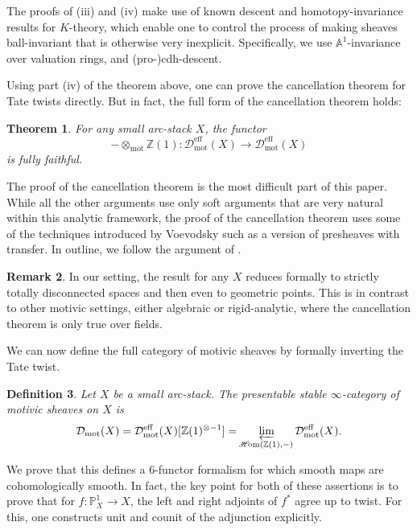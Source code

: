 \documentclass[11pt]{amsart}
\DeclareMathOperator{\intHom}{\!{\mathscr{H}\! om}}
\numberwithin{equation}{section}
\newtheorem{theorem}{Theorem}
\numberwithin{theorem}{section}
\newtheorem{definition}[theorem]{Definition}
\theoremstyle{definition}
\newtheorem{remark}[theorem]{Remark}
\begin{document}
The proofs of (iii) and (iv) make use of known descent and homotopy-invariance results for $K$-theory, which enable one to control the process of making sheaves ball-invariant that is otherwise very inexplicit. Specifically, we use $\mathbb A^1$-invariance over valuation rings, and (pro-)cdh-descent.

Using part (iv) of the theorem above, one can prove the cancellation theorem for Tate twists directly. But in fact, the full form of the cancellation theorem holds:

\begin{theorem} For any small arc-stack $X$, the functor
\[
-\otimes_{\mathrm{mot}} \mathbb Z(1): \mathcal D_{\mathrm{mot}}^{\mathrm{eff}}(X)\to \mathcal D_{\mathrm{mot}}^{\mathrm{eff}}(X)
\]
is fully faithful.
\end{theorem}

The proof of the cancellation theorem is the most difficult part of this paper. While all the other arguments use only soft arguments that are very natural within this analytic framework, the proof of the cancellation theorem uses some of the techniques introduced by Voevodsky such as a version of presheaves with transfer. In outline, we follow the argument of \cite{VoevodskyCancellation}.

\begin{remark} In our setting, the result for any $X$ reduces formally to strictly totally disconnected spaces and then even to geometric points. This is in contrast to other motivic settings, either algebraic or rigid-analytic, where the cancellation theorem is only true over fields.
\end{remark}

We can now define the full category of motivic sheaves by formally inverting the Tate twist.

\begin{definition} Let $X$ be a small arc-stack. The presentable stable $\infty$-category of motivic sheaves on $X$ is
\[
\mathcal D_{\mathrm{mot}}(X) = \mathcal D_{\mathrm{mot}}^{\mathrm{eff}}(X)[\mathbb Z(1)^{\otimes -1}] = \varprojlim_{\intHom(\mathbb Z(1),-)} \mathcal D_{\mathrm{mot}}^{\mathrm{eff}}(X).
\]
\end{definition}

We prove that this defines a $6$-functor formalism for which smooth maps are cohomologically smooth. In fact, the key point for both of these assertions is to prove that for $f: \mathbb P^1_X\to X$, the left and right adjoints of $f^\ast$ agree up to twist. For this, one constructs unit and counit of the adjunction explicitly.
\end{document}
